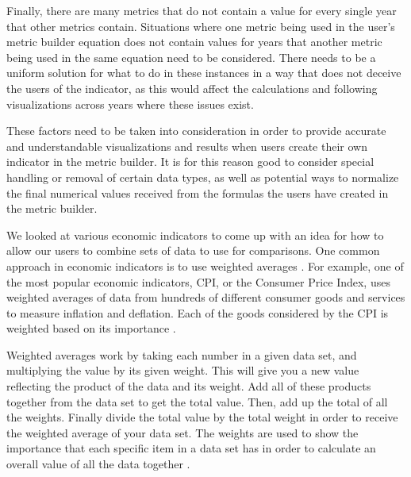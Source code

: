 Finally, there are many metrics that do not contain a value for every single year that other metrics contain. Situations where one metric being used in the user’s metric builder equation does not contain values for years that another metric being used in the same equation need to be considered. There needs to be a uniform solution for what to do in these instances in a way that does not deceive the users of the indicator, as this would affect the calculations and following visualizations across years where these issues exist.

These factors need to be taken into consideration in order to provide accurate and understandable visualizations and results when users create their own indicator in the metric builder. It is for this reason good to consider special handling or removal of certain data types, as well as potential ways to normalize the final numerical values received from the formulas the users have created in the metric builder.

We looked at various economic indicators to come up with an idea for how to allow our users to combine sets of data to use for comparisons. One common approach in economic indicators is to use weighted averages \cite{weightedaverage}. For example, one of the most popular economic indicators, CPI, or the Consumer Price Index, uses weighted averages of data from hundreds of different consumer goods and services to measure inflation and deflation. Each of the goods considered by the CPI is weighted based on its importance \cite{cpi}.

Weighted averages work by taking each number in a given data set, and multiplying the value by its given weight. This will give you a new value reflecting the product of the data and its weight. Add all of these products together from the data set to get the total value. Then, add up the total of all the weights. Finally divide the total value by the total weight in order to receive the weighted average of your data set. The weights are used to show the importance that each specific item in a data set has in order to calculate an overall value of all the data together \cite{economic}.
